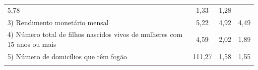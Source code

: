 \documentclass[]{book}
\theoremstyle{definition}
\theoremstyle{definition}
\theoremstyle{definition}
\theoremstyle{remark}
\begin{document}
\begin{longtable}[]{@{}lccc@{}}
\begin{minipage}[t]{0.19\columnwidth}
5,78\strut
\end{minipage} & \begin{minipage}[t]{0.20\columnwidth}\centering\strut
1,33\strut
\end{minipage} & \begin{minipage}[t]{0.26\columnwidth}\centering\strut
1,28\strut
\end{minipage}\tabularnewline
\begin{minipage}[t]{0.24\columnwidth}\raggedright\strut
3) Rendimento monetário mensal\strut
\end{minipage} & \begin{minipage}[t]{0.19\columnwidth}\centering\strut
5,22\strut
\end{minipage} & \begin{minipage}[t]{0.20\columnwidth}\centering\strut
4,92\strut
\end{minipage} & \begin{minipage}[t]{0.26\columnwidth}\centering\strut
4,49\strut
\end{minipage}\tabularnewline
\begin{minipage}[t]{0.24\columnwidth}\raggedright\strut
4) Número total de filhos nascidos vivos de mulheres com 15 anos ou
mais\strut
\end{minipage} & \begin{minipage}[t]{0.19\columnwidth}\centering\strut
4,59\strut
\end{minipage} & \begin{minipage}[t]{0.20\columnwidth}\centering\strut
2,02\strut
\end{minipage} & \begin{minipage}[t]{0.26\columnwidth}\centering\strut
1,89\strut
\end{minipage}\tabularnewline
\begin{minipage}[t]{0.24\columnwidth}\raggedright\strut
5) Número de domicílios que têm fogão\strut
\end{minipage} & \begin{minipage}[t]{0.19\columnwidth}\centering\strut
111,27\strut
\end{minipage} & \begin{minipage}[t]{0.20\columnwidth}\centering\strut
1,58\strut
\end{minipage} & \begin{minipage}[t]{0.26\columnwidth}\centering\strut
1,55\strut
\end{minipage}\tabularnewline
\begin{minipage}[t]{0.24\columnwidth}\raggedright\strut

\end{minipage}
\end{longtable}
\end{document}
